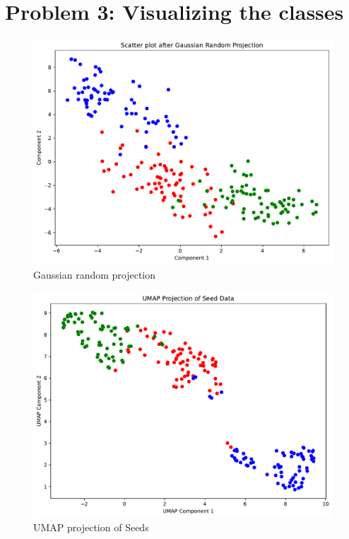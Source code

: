 \documentclass[a4paper]{article}
\begin{document}
\section*{Problem 3: Visualizing the classes}

\begin{figure}[H]
  \begin{center}
    \includegraphics[width=\textwidth]{ola/gaussian_random_projection.pdf}
    \caption{Gaussian random projection}
    \label{fig:gaussian_random_projection}
  \end{center}
\end{figure}

\begin{figure}[H]
  \begin{center}
    \includegraphics[width=\textwidth]{ola/umap.pdf}
    \caption{UMAP projection of Seeds}
    \label{fig:umap}
  \end{center}
\end{figure}
\end{document}
